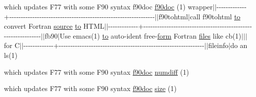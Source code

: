 \begin{DoxyCompactItemize}
which updates F77 with some F90 syntax f90doc \hyperlink{what__overview_81_8txt_aab2f56fdcdfab484c0d861985675a92f}{f90doc} (1) wrapper$\vert$$\vert$-\/-\/-\/-\/-\/-\/-\/-\/-\/-\/-\/-\/-\/+-\/-\/-\/-\/-\/-\/-\/-\/-\/-\/-\/-\/-\/-\/-\/-\/-\/-\/-\/-\/-\/-\/-\/-\/-\/-\/-\/-\/-\/-\/-\/-\/-\/-\/-\/-\/-\/-\/-\/-\/-\/-\/-\/-\/-\/-\/-\/-\/-\/-\/-\/-\/-\/-\/-\/-\/-\/-\/-\/-\/-\/-\/-\/$\vert$$\vert$f90tohtml$\vert$call f90tohtml \hyperlink{M__stopwatch_83_8txt_a97209fd3e34ef701c0a9734280779cbb}{to} convert Fortran \hyperlink{ufpp__overview_81_8txt_a4d6669ece605d05985c83a04dd38e0ad}{source} \hyperlink{M__stopwatch_83_8txt_a97209fd3e34ef701c0a9734280779cbb}{to} H\+T\+ML$\vert$$\vert$-\/-\/-\/-\/-\/-\/-\/-\/-\/-\/-\/-\/-\/+-\/-\/-\/-\/-\/-\/-\/-\/-\/-\/-\/-\/-\/-\/-\/-\/-\/-\/-\/-\/-\/-\/-\/-\/-\/-\/-\/-\/-\/-\/-\/-\/-\/-\/-\/-\/-\/-\/-\/-\/-\/-\/-\/-\/-\/-\/-\/-\/-\/-\/-\/-\/-\/-\/-\/-\/-\/-\/-\/-\/-\/-\/-\/$\vert$$\vert$fb90$\vert$Use emacs(1) \hyperlink{M__stopwatch_83_8txt_a97209fd3e34ef701c0a9734280779cbb}{to} auto-\/ident free-\/\hyperlink{what__overview_81_8txt_a38fd6af8f74c855277361d46600fb9e7}{form} Fortran \hyperlink{ufpp__overview_81_8txt_a5673f2294ff1627be40c90eae33141ca}{files} like cb(1)$\vert$$\vert$$\vert$for C$\vert$$\vert$-\/-\/-\/-\/-\/-\/-\/-\/-\/-\/-\/-\/-\/+-\/-\/-\/-\/-\/-\/-\/-\/-\/-\/-\/-\/-\/-\/-\/-\/-\/-\/-\/-\/-\/-\/-\/-\/-\/-\/-\/-\/-\/-\/-\/-\/-\/-\/-\/-\/-\/-\/-\/-\/-\/-\/-\/-\/-\/-\/-\/-\/-\/-\/-\/-\/-\/-\/-\/-\/-\/-\/-\/-\/-\/-\/-\/$\vert$$\vert$fileinfo$\vert$do an ls(1)
\item 
which updates F77 with some F90 syntax \hyperlink{what__overview_81_8txt_aab2f56fdcdfab484c0d861985675a92f}{f90doc} \hyperlink{what__overview_81_8txt_a7d9f0f7f68d767709cf298ae59490237}{numdiff} (1)
\item 
which updates F77 with some F90 syntax \hyperlink{what__overview_81_8txt_aab2f56fdcdfab484c0d861985675a92f}{f90doc} \hyperlink{what__overview_81_8txt_ab5692ed87074f1d5ec850a9ffa8b5af9}{size} (1)
\end{DoxyCompactItemize}
